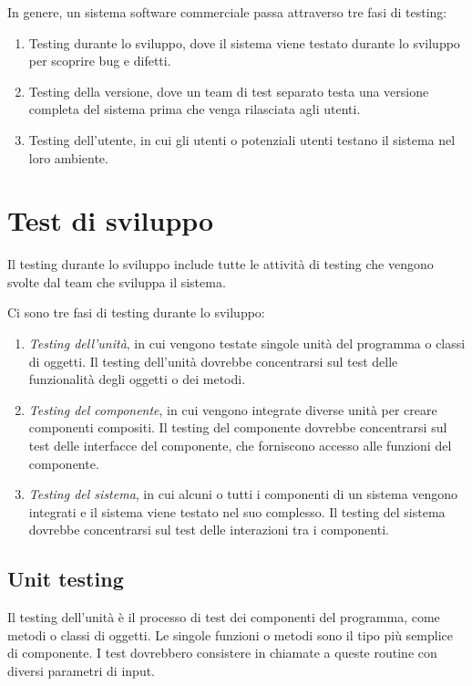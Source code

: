 In genere, un sistema software commerciale passa attraverso tre fasi di testing:
\begin{enumerate}
    \item Testing durante lo sviluppo, dove il sistema viene testato durante lo sviluppo per scoprire bug e difetti.
    \item Testing della versione, dove un team di test separato testa una versione completa del sistema prima che venga rilasciata agli utenti.
    \item Testing dell'utente, in cui gli utenti o potenziali utenti testano il sistema nel loro ambiente.
\end{enumerate}

\section{Test di sviluppo}
Il testing durante lo sviluppo include tutte le attività di testing che vengono svolte dal team che sviluppa il sistema.

Ci sono tre fasi di testing durante lo sviluppo:
\begin{enumerate}
    \item \textit{Testing dell’unità}, in cui vengono testate singole unità del programma o classi di oggetti. Il testing dell’unità dovrebbe concentrarsi sul test delle funzionalità degli oggetti o dei metodi.
    \item \textit{Testing del componente}, in cui vengono integrate diverse unità per creare componenti compositi. Il testing del componente dovrebbe concentrarsi sul test delle interfacce del componente, che forniscono accesso alle funzioni del componente.
    \item \textit{Testing del sistema}, in cui alcuni o tutti i componenti di un sistema vengono integrati e il sistema viene testato nel suo complesso. Il testing del sistema dovrebbe concentrarsi sul test delle interazioni tra i componenti.
\end{enumerate}

\subsection{Unit testing}
Il testing dell’unità è il processo di test dei componenti del programma, come metodi o classi di oggetti. Le singole funzioni o metodi sono il tipo più semplice di componente. I test dovrebbero consistere in chiamate a queste routine con diversi parametri di input.

